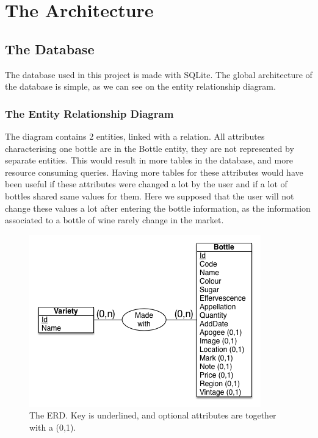 

\section{The Architecture}

\subsection{The Database}

The database used in this project is made with SQLite. The global architecture of the database is simple, as we can see on the entity relationship diagram.

\subsubsection{The Entity Relationship Diagram}

The diagram contains 2 entities, linked with a relation. All attributes characterising one bottle are in the Bottle entity, they are not represented by separate entities. This would result in more tables in the database, and more resource consuming queries. Having more tables for these attributes would have been useful if these attributes were changed a lot by the user and if a lot of bottles shared same values for them. Here we supposed that the user will not change these values a lot after entering the bottle information, as the information associated to a bottle of wine rarely change in the market.

\begin{figure}[H]
\begin{center}
	\includegraphics[scale=0.7]{../Entity Relationship DB diagram.png}
	\caption{The ERD. Key is underlined, and optional attributes are together with a (0,1).}
\end{center}
\end{figure}

